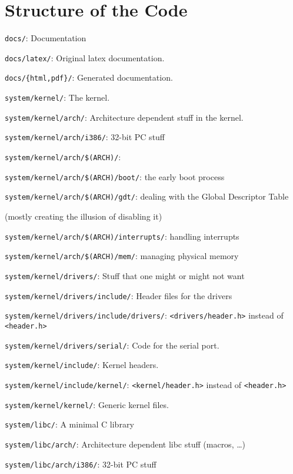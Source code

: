 \documentclass[12pt]{article}
\newcommand{\code}[1]{\colorbox{light-gray}{\texttt{#1}}}
\begin{document}
\section{Structure of the Code}
\begin{list}{}{}
\item \code{docs/}: Documentation
\item \code{docs/latex/}: Original latex documentation.
\item \code{docs/\{html,pdf\}/}: Generated documentation.
\item \code{system/kernel/}: The kernel.
\item \code{system/kernel/arch/}: Architecture dependent stuff in the kernel.
\item \code{system/kernel/arch/i386/}: 32-bit PC stuff
\item \code{system/kernel/arch/\$(ARCH)/}:
\item \code{system/kernel/arch/\$(ARCH)/boot/}: the early boot process
\item \code{system/kernel/arch/\$(ARCH)/gdt/}: dealing with the Global Descriptor Table \begin{small}(mostly creating the illusion of disabling it)\end{small}
\item \code{system/kernel/arch/\$(ARCH)/interrupts/}: handling interrupts
\item \code{system/kernel/arch/\$(ARCH)/mem/}: managing physical memory
\item \code{system/kernel/drivers/}: Stuff that one might or might not want
\item \code{system/kernel/drivers/include/}: Header files for the drivers
\item \code{system/kernel/drivers/include/drivers/}: \code{<drivers/header.h>} instead of \code{<header.h>}
\item \code{system/kernel/drivers/serial/}: Code for the serial port.
\item \code{system/kernel/include/}: Kernel headers.
\item \code{system/kernel/include/kernel/}: \code{<kernel/header.h>} instead of \code{<header.h>}
\item \code{system/kernel/kernel/}: Generic kernel files.
\item \code{system/libc/}: A minimal C library
\item \code{system/libc/arch/}: Architecture dependent libc stuff (macros, …)
\item \code{system/libc/arch/i386/}: 32-bit PC stuff

\end{list}
\end{document}
